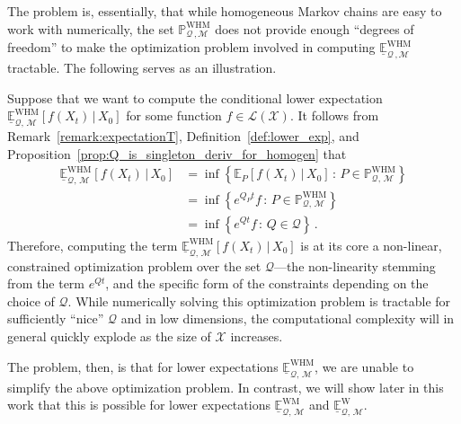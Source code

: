\documentclass[10pt,a4paper]{paper}
\theoremstyle{definition}
\newtheorem{exmp}{Example}%
\newcommand{\states}{\mathcal{X}}
\newcommand{\processes}{\mathbb{P}}
\newcommand{\whmprocesses}{\processes^{\mathrm{WHM}}}
\newcommand{\gambles}{\mathcal{L}}
\newcommand{\gamblesX}{\gambles(\states)}
\newcommand{\rateset}{\mathcal{Q}}
\newcommand{\exampleend}{\hfill$\Diamond$}
\begin{document}
The problem is, essentially, that while homogeneous Markov chains are easy to work with numerically, the set $\whmprocesses_{\rateset\,,\mathcal{M}}$ does not provide enough ``degrees of freedom'' to make the optimization problem involved in computing $\underline{\mathbb{E}}^\mathrm{WHM}_{\rateset\,,\mathcal{M}}$ tractable. The following serves as an illustration. 


Suppose that we want to compute the conditional lower expectation $\underline{\mathbb{E}}_{\rateset,\,\mathcal{M}}^{\mathrm{WHM}}[f(X_t)\,\vert\,X_0]$ for some function $f\in\gamblesX$. It follows from Remark~\ref{remark:expectationT}, Definition~\ref{def:lower_exp}, and Proposition~\ref{prop:Q_is_singleton_deriv_for_homogen} that
\begin{align*}
\underline{\mathbb{E}}_{\rateset,\,\mathcal{M}}^{\mathrm{WHM}}[f(X_t)\,\vert\,X_0] &= \inf\left\{ \mathbb{E}_P[f(X_t)\,\vert\,X_0]\,:\,P\in\whmprocesses_{\rateset,\,\mathcal{M}} \right\} \\
 &= \inf\left\{ e^{Q_P t}f\,:\,P\in\whmprocesses_{\rateset,\,\mathcal{M}} \right\} \\
 &= \inf\left\{ e^{Q t}f\,:\,Q\in\rateset\right\}\,.
\end{align*}
Therefore, computing the term $\underline{\mathbb{E}}_{\rateset,\,\mathcal{M}}^{\mathrm{WHM}}[f(X_t)\,\vert\,X_0]$ is at its core a non-linear, constrained optimization problem over the set $\rateset$---the non-linearity stemming from the term $e^{Qt}$, and the specific form of the constraints depending on the choice of $\rateset$. While numerically solving this optimization problem is tractable for sufficiently ``nice'' $\rateset$ and in low dimensions, the computational complexity will in general quickly explode as the size of $\states$ increases.

The problem, then, is that for lower expectations $\underline{\mathbb{E}}_{\rateset,\,\mathcal{M}}^{\mathrm{WHM}}$, we are unable to simplify the above optimization problem. In contrast, we will show later in this work that this is possible for lower expectations $\underline{\mathbb{E}}_{\rateset,\,\mathcal{M}}^{\mathrm{WM}}$ and $\underline{\mathbb{E}}_{\rateset,\,\mathcal{M}}^{\mathrm{W}}$.
\end{document}
